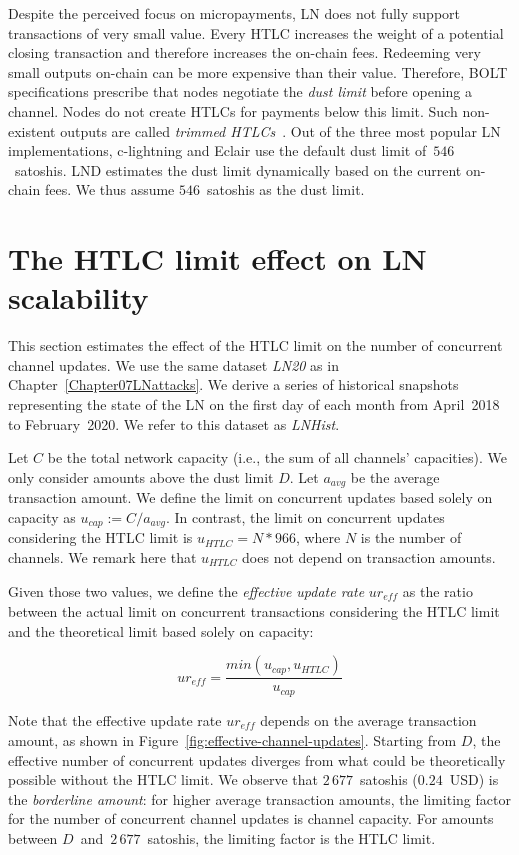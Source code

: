 Despite the perceived focus on micropayments, LN does not fully support transactions of very small value.
Every HTLC increases the weight of a potential closing transaction and therefore increases the on-chain fees.
Redeeming very small outputs on-chain can be more expensive than their value.
Therefore, BOLT specifications prescribe that nodes negotiate the \textit{dust limit} before opening a channel.
Nodes do not create HTLCs for payments below this limit.
Such non-existent outputs are called \textit{trimmed HTLCs}~\cite{BOLT3Trimmed}.
Out of the three most popular LN implementations, c-lightning and Eclair use the default dust limit of~$546$~satoshis.
LND estimates the dust limit dynamically based on the current on-chain fees.
We thus assume $546$~satoshis as the dust limit.


\section{The HTLC limit effect on LN scalability}

This section estimates the effect of the HTLC limit on the number of concurrent channel updates.
We use the same dataset \textit{LN20} as in Chapter~\ref{Chapter07LNattacks}.
We derive a series of historical snapshots representing the state of the LN on the first day of each month from April~2018 to February~2020.
We refer to this dataset as \textit{LNHist}.

Let $C$ be the total network capacity (i.e., the sum of all channels' capacities).
We only consider amounts above the dust limit $D$.
Let $a_\textit{avg}$ be the average transaction amount.
We define the limit on concurrent updates based solely on capacity as $u_\textit{cap} := C / a_\textit{avg}$.
In contrast, the limit on concurrent updates considering the HTLC limit is $u_\textit{HTLC} = N * 966$, where $N$ is the number of channels.
We remark here that $u_\textit{HTLC}$ does not depend on transaction amounts.

Given those two values, we define the \textit{effective update rate} $ur_\textit{eff}$ as the ratio between the actual limit on concurrent transactions considering the HTLC limit and the theoretical limit based solely on capacity:

\[ur_\textit{eff} = \frac{min(u_\textit{cap}, u_\textit{HTLC})}{u_\textit{cap}}\]

Note that the effective update rate $ur_\textit{eff}$ depends on the average transaction amount, as shown in Figure~\ref{fig:effective-channel-updates}.
Starting from $D$, the effective number of concurrent updates diverges from what could be theoretically possible without the HTLC limit.
We observe that $2\,677$~satoshis ($0.24$~USD) is the \textit{borderline amount}: for higher average transaction amounts, the limiting factor for the number of concurrent channel updates is channel capacity.
For amounts between $D$~and~$2\,677$~satoshis, the limiting factor is the HTLC limit.

